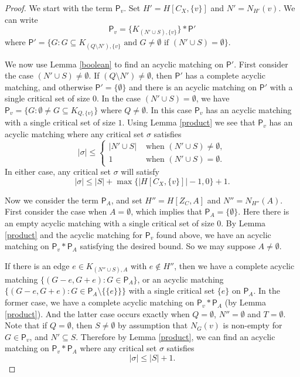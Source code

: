 \documentclass[10pt]{amsart}
\theoremstyle{definition}
\begin{document}
	\begin{proof}
		We start with the term $\mathsf{P}_v$. Set $H' = H[C_X, \{v\}]$ and $N' = N_{H'}(v)$. We can write
		\[ \mathsf{P}_v = \{ K_{(N'\cup S), \{v\}} \}
		* \mathsf{P}'
		\]
		where 
		$\mathsf{P}' = \{
		G : G\subseteq K_{(Q\setminus N'), \{v\}} \text{ and } G\neq \emptyset \text{ if }
		(N'\cup S) = \emptyset\}$.
		
		We now use Lemma \ref{boolean} to find an acyclic matching on $\mathsf{P}'$. First consider the case $(N'\cup S) \neq \emptyset$. If $(Q\setminus N') \neq \emptyset$, then $\mathsf{P}'$ has a complete acyclic matching, and otherwise $\mathsf{P}' = \{\emptyset\}$ and there is an acyclic matching on $\mathsf{P}'$ with a single critical set of size $0$. 
		In the case $(N'\cup S) = \emptyset$, we have 
		$\mathsf{P}_v = \{
		G : \emptyset \neq G \subseteq K_{Q, \{v\}} \}$ where $Q\neq \emptyset$. In this case $\mathsf{P}_v$ has an acyclic matching with a single critical set of size $1$.  Using Lemma \ref{product} we see that $\mathsf{P}_v$ has an acyclic matching where any critical set $\sigma$ satisfies
		\[|\sigma|\leq
		\begin{cases}
		|N' \cup S| & \text{ when } (N' \cup S) \neq \emptyset, \\
		1 & \text{ when } (N' \cup S) = \emptyset. 
		\end{cases}
		\]
		In either case, any critical set $\sigma$ will satisfy\textbf{}
		\[|\sigma| \leq |S| + \max\{ |H[C_X, \{v\}]|-1, 0 \} +1.\]
		
		Now we consider the term $\mathsf{P}_A$, and set $H'' = H[Z_C, A]$ and $N'' = N_{H''}(A)$. %
		First consider the case when $A = \emptyset$, which implies that $\mathsf{P}_A = \{\emptyset\}$. Here there is an empty acyclic matching with a single critical set of size $0$. By Lemma \ref{product} and the acyclic matching for $\mathsf{P}_v$ found above, we have an acyclic matching on $\mathsf{P}_v * \mathsf{P}_A$ satisfying the desired bound. So we may suppose $A\neq \emptyset$.
		
		If there is an edge $e \in K_{(N''\cup S), A}$ with $e\not\in H''$,  then we have a complete acyclic matching $\{ (G-e, G+e) : G\in \mathsf{P}_A \}$, or an acyclic matching $\{ (G-e, G+e) : G\in \mathsf{P}_A\setminus \{\{e\} \} \}$ with a single critical set $\{e\}$ on $\mathsf{P}_A$. In the former case, we have a complete acyclic matching on $\mathsf{P}_v * \mathsf{P}_A$ (by Lemma \ref{product}). And the latter case occurs exactly when $Q=\emptyset$, $N''=\emptyset$ and $T=\emptyset$. Note that if $Q=\emptyset$, then $S\neq\emptyset$ by assumption that $N_G(v)$ is non-empty for $G\in \mathsf{P}_v$, and $N'\subseteq S$. Therefore by Lemma \ref{product}, we can find an acyclic matching  on $\mathsf{P}_v * \mathsf{P}_A$ where any critical set $\sigma$ satisfies
		$$|\sigma|\leq |S|+1.$$
		

\end{proof}
\end{document}
